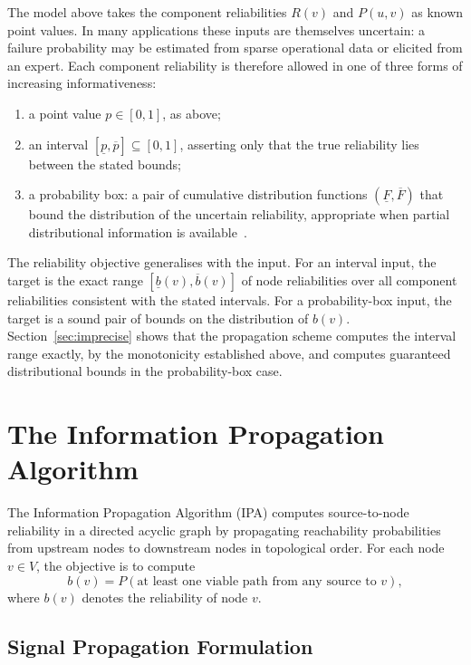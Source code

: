 \documentclass[preprint,12pt]{elsarticle}
\begin{document}
The model above takes the component reliabilities $R(v)$ and $P(u,v)$ as known point values. In many applications these inputs are themselves uncertain: a failure probability may be estimated from sparse operational data or elicited from an expert. Each component reliability is therefore allowed in one of three forms of increasing informativeness:
\begin{enumerate}
    \item a point value $p \in [0,1]$, as above;
    \item an interval $[\underline{p}, \overline{p}] \subseteq [0,1]$, asserting only that the true reliability lies between the stated bounds;
    \item a probability box: a pair of cumulative distribution functions $(\underline{F}, \overline{F})$ that bound the distribution of the uncertain reliability, appropriate when partial distributional information is available~\cite{ferson_constructing_2003,williamson_probabilistic_1990}.
\end{enumerate}
The reliability objective generalises with the input. For an interval input, the target is the exact range $[\underline{b}(v), \overline{b}(v)]$ of node reliabilities over all component reliabilities consistent with the stated intervals. For a probability-box input, the target is a sound pair of bounds on the distribution of $b(v)$. Section~\ref{sec:imprecise} shows that the propagation scheme computes the interval range exactly, by the monotonicity established above, and computes guaranteed distributional bounds in the probability-box case.

\section{The Information Propagation Algorithm}\label{sec:IPA}

The Information Propagation Algorithm (IPA) computes source-to-node reliability in a directed acyclic graph by propagating reachability probabilities from upstream nodes to downstream nodes in topological order. For each node $v \in V$, the objective is to compute
\begin{equation}
b(v) = P(\text{at least one viable path from any source to } v),
\end{equation}
where $b(v)$ denotes the reliability of node $v$.

\subsection{Signal Propagation Formulation}
\end{document}
